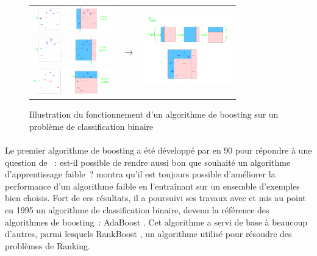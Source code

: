 \documentclass[pdftex,a4paper,11pt]{article}
\begin{document}
\begin{figure}
    \centering
    \begin{tabular}{cccc} 
        \includegraphics[height=1.1cm]{fig/0} & \includegraphics[height=1.1cm]{fig/1} & \multirow{3}{*}{$\to$} & \multirow{3}{*}{\includegraphics[height=3cm]{fig/6}} \\
        \includegraphics[height=1.1cm]{fig/2} & \includegraphics[height=1.1cm]{fig/3} & & \\
        \includegraphics[height=1.1cm]{fig/4} & \includegraphics[height=1.1cm]{fig/5} & &
    \end{tabular} 
    \caption{Illustration du fonctionnement d'un algorithme de boosting sur un problème de classification binaire}
    \label{fig:exemple}
\end{figure}    

\paragraph{}
Le premier algorithme de boosting a été développé par  en 90 \cite{schapire1990strength} pour répondre à une question de  \cite{kearns1988thoughts}~: est-il possible de rendre aussi bon que souhaité un algorithme d’apprentissage \og{}faible\fg{}~?
 montra qu'il est toujours possible d'améliorer la performance d'un algorithme faible en l'entraînant sur un ensemble d'exemples bien choisis.
Fort de ces résultats, il a poursuivi ses travaux avec  et mis au point en 1995 un algorithme de classification binaire, devenu la référence des algorithmes de boosting~: AdaBoost \cite{freund1995desicion}.
Cet algorithme a servi de base à beaucoup d'autres, parmi lesquels RankBoost \cite{freund1998efficient}, un algorithme utilisé pour résoudre des problèmes de Ranking.
\end{document}
